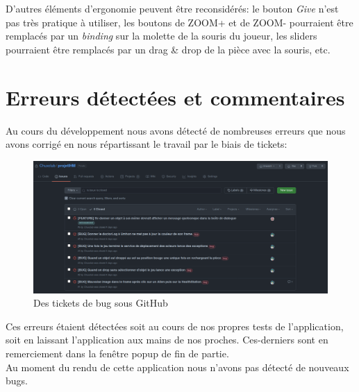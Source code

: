\documentclass[./standalone.tex]{subfiles}
\begin{document}
D'autres éléments d'ergonomie peuvent être reconsidérés: le bouton \textit{Give} n'est pas très pratique à utiliser, les boutons de ZOOM+ et de ZOOM- pourraient être remplacés par un \textit{binding} sur la molette de la souris du joueur, les sliders pourraient être remplacés par un drag \& drop de la pièce avec la souris, etc.

\newpage

\section{Erreurs détectées et commentaires}

Au cours du développement nous avons détecté de nombreuses erreurs que nous avons corrigé en nous répartissant le travail par le biais de tickets:

\begin{center}
	\begin{figure}[h!]
	\includegraphics[scale=0.25]{images/tickets.png}
	\caption{Des tickets de bug sous GitHub}
	\end{figure}
\end{center}

Ces erreurs étaient détectées soit au cours de nos propres tests de l'application, soit en laissant l'application aux mains de nos proches. Ces-derniers sont en remerciement dans la fenêtre popup de fin de partie.\\

Au moment du rendu de cette application nous n'avons pas détecté de nouveaux bugs.


\newpage
\end{document}
